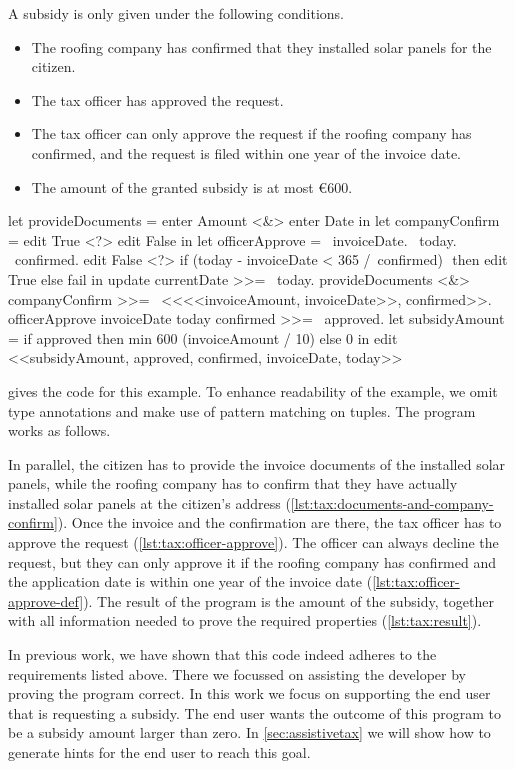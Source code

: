 A subsidy is only given under the following conditions.
\begin{itemize}
\item The roofing company has confirmed that they installed solar panels for the citizen.
\item The tax officer has approved the request.
\item The tax officer can only approve the request if the roofing company has confirmed, and the request is filed within one year of the invoice date.
\item The amount of the granted subsidy is at most €600.
\end{itemize}

\begin{TASK}[
    float=ht,
    numbers=right,
    caption={Subsidy request and approval workflow at the Dutch tax office.},
    captionpos=b,
    label=lst:tax]
  let provideDocuments = enter Amount <&> enter Date in
  let companyConfirm = edit True <?> edit False in
  let officerApprove = \ invoiceDate. \ today. \ confirmed.
    edit False <?> if (today - invoiceDate < 365 /\ confirmed) $\label{lst:tax:officer-approve-def}$ then edit True else fail in
  update currentDate >>= \ today.$\label{lst:tax:citizen-info}$
  provideDocuments <&> companyConfirm >>= \ <<<<invoiceAmount, invoiceDate>>, confirmed>>. $\label{lst:tax:documents-and-company-confirm}$
  officerApprove invoiceDate today confirmed >>= \ approved.$\label{lst:tax:officer-approve}$
  let subsidyAmount = if approved then min 600 (invoiceAmount / 10) else 0 in
  edit <<subsidyAmount, approved, confirmed, invoiceDate, today>>$\label{lst:tax:result}$
\end{TASK}

 gives the \TOPHAT code for this example.
To enhance readability of the example,
we omit type annotations and make use of pattern matching on tuples.
The program works as follows.

In parallel, the citizen has to provide the invoice documents of the installed solar panels, while the roofing company has to confirm that they have actually installed solar panels at the citizen's address (\cref{lst:tax:documents-and-company-confirm}).
Once the invoice and the confirmation are there, the tax officer has to approve the request (\cref{lst:tax:officer-approve}).
The officer can always decline the request, but they can only approve it if the roofing company has confirmed and the application date is within one year of the invoice date (\cref{lst:tax:officer-approve-def}).
The result of the program is the amount of the subsidy, together with all information needed to prove the required properties (\cref{lst:tax:result}).

In previous work, we have shown that this code indeed adheres to the requirements listed above.
There we focussed on assisting the developer by proving the program correct.
In this work we focus on supporting the end user that is requesting a subsidy.
The end user wants the outcome of this program to be a subsidy amount larger than zero.
In \cref{sec:assistivetax} we will show how to generate hints for the end user to reach this goal.
